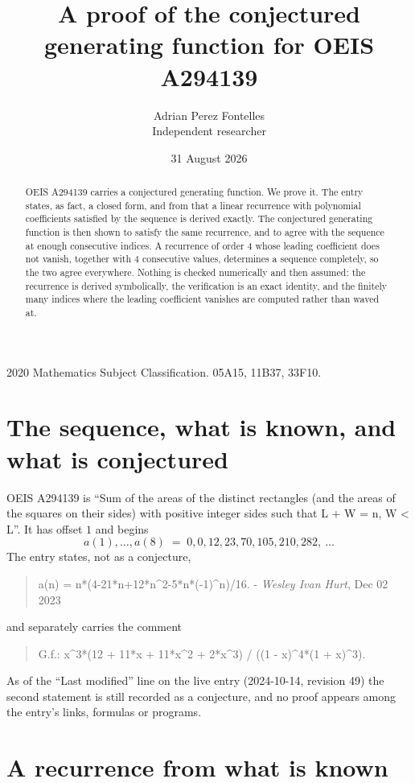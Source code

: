 \documentclass[11pt,a4paper]{article}
\title{A proof of the conjectured generating function for OEIS A294139}
\author{Adrian Perez Fontelles\\ \small Independent researcher}
\date{31 August 2026}
\theoremstyle{plain}
\theoremstyle{definition}
\begin{document}
\maketitle

\begin{abstract}
OEIS A294139 carries a conjectured generating function. We prove it. The entry states, as fact,
a closed form, and from that a linear recurrence with polynomial coefficients satisfied by
the sequence is derived exactly. The conjectured generating function is then shown to satisfy the
same recurrence, and to agree with the sequence at enough consecutive indices. A recurrence
of order $4$ whose leading coefficient does not vanish, together with $4$
consecutive values, determines a sequence completely, so the two agree everywhere. Nothing
is checked numerically and then assumed: the recurrence is derived symbolically, the
verification is an exact identity, and the finitely many indices where the leading
coefficient vanishes are computed rather than waved at.
\end{abstract}

\noindent\small 2020 Mathematics Subject Classification. 05A15, 11B37, 33F10.\normalsize

\section{The sequence, what is known, and what is conjectured}

OEIS A294139 is ``Sum of the areas of the distinct rectangles (and the areas of the squares on their sides) with positive integer sides such that L + W = n, W < L''. It has offset $1$ and begins
\[
a(1),\dots,a(8)\;=\;0, 0, 12, 23, 70, 105, 210, 282,\ \dots
\]
The entry states, not as a conjecture,
\begin{quote}\small
a(n) = n*(4-21*n+12*n\textasciicircum{}2-5*n*(-1)\textasciicircum{}n)/16. - \emph{Wesley Ivan Hurt}, Dec 02 2023
\end{quote}
and separately carries the comment
\begin{quote}\small
G.f.: x\textasciicircum{}3*(12 + 11*x + 11*x\textasciicircum{}2 + 2*x\textasciicircum{}3) / ((1 - x)\textasciicircum{}4*(1 + x)\textasciicircum{}3).
\end{quote}
As of the ``Last modified'' line on the live entry (2024-10-14, revision 49) the second
statement is still recorded as a conjecture, and no proof appears among the entry's links,
formulas or programs.

\section{A recurrence from what is known}
\end{document}
